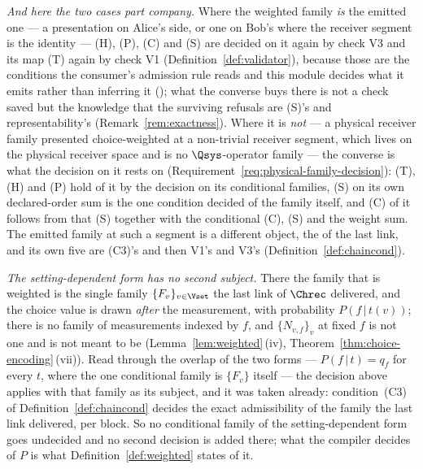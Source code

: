 \begin{remark}
\emph{And here the two cases part company.} Where the weighted family
\emph{is} the emitted one --- a presentation on Alice's side, or one on Bob's
where the receiver segment is the identity --- (H), (P), (C) and (S) are decided
on it again by check V3 and its map (T) again by check V1
(Definition~\ref{def:validator}), because those are the conditions the
consumer's admission rule reads and this module decides what it emits rather
than inferring it (); what the converse
buys there is not a check saved but the knowledge that the surviving refusals
are (S)'s and representability's (Remark~\ref{rem:exactness}). Where it is
\emph{not} --- a physical receiver family presented choice-weighted at a
non-trivial receiver segment, which lives on the physical receiver space and
is no $\Qsys$-operator family --- the converse is what the decision on it
rests on (Requirement~\ref{req:physical-family-decision}): (T), (H) and (P)
hold of it by the decision on its conditional families, (S) on its own
declared-order sum is the one condition decided of the family itself, and (C)
of it follows from that (S) together with the conditional (C), (S) and the
weight sum. The emitted
family at such a segment is a different object, the  of the last
link, and its own five are (C3)'s and then V1's and V3's
(Definition~\ref{def:chaincond}).

\emph{The setting-dependent form has no second subject.} There the family that
is weighted is the single family $\{F_v\}_{v\in\Vset}$ the last link of
$\Chrec$ delivered, and the choice value is drawn \emph{after} the
measurement, with probability $P(f\,|\,t(v))$; there is no family of
measurements indexed by $f$, and $\{N_{v,f}\}_v$ at fixed $f$ is not one and
is not meant to be (Lemma~\ref{lem:weighted}\,(iv),
Theorem~\ref{thm:choice-encoding}\,(vii)). Read through the overlap of the two forms ---
$P(f\,|\,t)=q_f$ for every $t$, where the one conditional family is $\{F_v\}$
itself --- the decision above applies with that family as its subject, and it
was taken already: condition~(C3) of Definition~\ref{def:chaincond} decides
the exact admissibility of the family the last link delivered, per block. So
no conditional family of the setting-dependent form goes undecided and no
second decision is added there; what the compiler decides of $P$ is what
Definition~\ref{def:weighted} states of it.


\end{remark}
